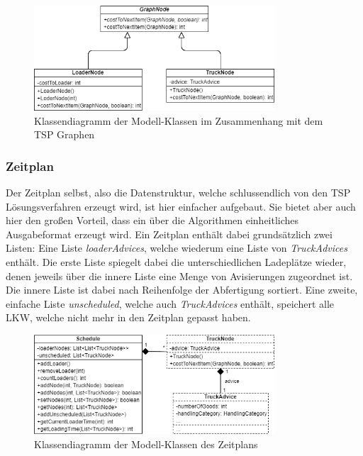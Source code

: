 \begin{figure}[H]
    \centering
    \includegraphics[width=0.8\textwidth]{images/classDiagrams/TSP_Graph_ClassDiagram.png}
    \caption{Klassendiagramm der Modell-Klassen im Zusammenhang mit dem TSP Graphen}
    \label{fig:tspClassDiagramGraph}
\end{figure}


\subsubsection{Zeitplan}

Der Zeitplan selbst, also die Datenstruktur, welche schlussendlich von den TSP Lösungsverfahren erzeugt wird, ist hier einfacher aufgebaut. Sie bietet aber auch hier den großen Vorteil, dass ein über die Algorithmen einheitliches Ausgabeformat erzeugt wird. Ein Zeitplan enthält dabei grundsätzlich zwei Listen: Eine Liste \textit{loaderAdvices}, welche wiederum eine Liste von \textit{TruckAdvices} enthält. Die erste Liste spiegelt dabei die unterschiedlichen Ladeplätze wieder, denen jeweils über die innere Liste eine Menge von Avisierungen zugeordnet ist. Die innere Liste ist dabei nach Reihenfolge der Abfertigung sortiert. Eine zweite, einfache Liste \textit{unscheduled}, welche auch \textit{TruckAdvices} enthält, speichert alle LKW, welche nicht mehr in den Zeitplan gepasst haben.

\begin{figure}[H]
    \centering
    \includegraphics[width=0.8\textwidth]{images/classDiagrams/TSP_Schedule_ClassDiagram.png}
    \caption{Klassendiagramm der Modell-Klassen des Zeitplans}
    \label{fig:tspClassDiagramSchedule}
\end{figure}


